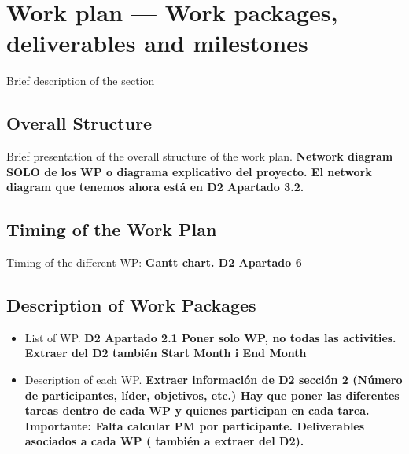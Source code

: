 \section{Work plan — Work packages, deliverables and milestones}

Brief description of the section

\subsection{Overall Structure}

Brief presentation of the overall structure of the work plan. \textbf{Network diagram SOLO de los WP o diagrama explicativo del proyecto. El network diagram que tenemos ahora está en D2 Apartado 3.2.}

\subsection{Timing of the Work Plan}

Timing of the different WP: \textbf{Gantt chart. D2 Apartado 6}

\subsection{Description of Work Packages}

\begin{itemize}

\item List of WP. \textbf{D2 Apartado 2.1 Poner solo WP, no todas las activities. Extraer del D2 también Start Month i End Month}

\item Description of each WP. \textbf{Extraer información de D2 sección 2 (Número de participantes, líder, objetivos, etc.) Hay que poner las diferentes tareas dentro de cada WP y quienes participan en cada tarea. Importante: Falta calcular PM por participante. Deliverables asociados a cada WP ( también a extraer del D2).}

\end{itemize}

